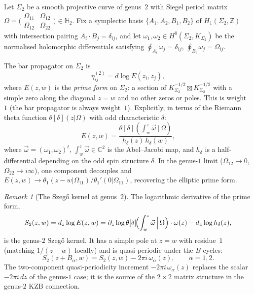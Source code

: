 \documentclass[11pt,reqno]{amsart}
\theoremstyle{definition}
\theoremstyle{remark}
\newtheorem{remark}[theorem]{Remark}
\newcommand{\CC}{\mathbb{C}}
\newcommand{\ZZ}{\mathbb{Z}}
\newcommand{\HHH}{\mathbb{H}}
\numberwithin{equation}{section}
\begin{document}
Let $\Sigma_2$ be a smooth projective curve of genus~$2$
with Siegel period matrix
$\Omega = \bigl(\begin{smallmatrix}
\Omega_{11} & \Omega_{12} \\
\Omega_{12} & \Omega_{22}
\end{smallmatrix}\bigr)
\in \HHH_2$.
Fix a symplectic basis
$\{A_1, A_2, B_1, B_2\}$ of $H_1(\Sigma_2, \ZZ)$
with intersection pairing
$A_i \cdot B_j = \delta_{ij}$, and let
$\omega_1, \omega_2 \in H^0(\Sigma_2, K_{\Sigma_2})$
be the normalised holomorphic differentials satisfying
$\oint_{A_i} \omega_j = \delta_{ij}$,
$\oint_{B_i} \omega_j = \Omega_{ij}$.

The bar propagator on $\Sigma_2$ is
\begin{equation}\label{eq:bar-prop-g2}
  \eta^{(2)}_{ij}
  = d\log E(z_i, z_j),
\end{equation}
where $E(z,w)$ is the \emph{prime form} on $\Sigma_2$:
a section of $K_{\Sigma_2}^{-1/2} \boxtimes
K_{\Sigma_2}^{-1/2}$ with a simple zero along the
diagonal $z = w$ and no other zeros or poles.
This is weight~$1$ (the bar propagator is always weight~$1$).
Explicitly, in terms of the Riemann theta function
$\theta[\delta](z|\Omega)$ with odd characteristic
$\delta$:
\begin{equation}\label{eq:prime-form-g2}
  E(z, w)
  = \frac{\theta[\delta]\!\left(
  \int_w^z \vec{\omega}\,\big|\,\Omega\right)}
  {h_\delta(z)\,h_\delta(w)},
\end{equation}
where $\vec{\omega} = (\omega_1, \omega_2)^t$,
$\int_w^z \vec{\omega} \in \CC^2$ is the Abel--Jacobi
map, and $h_\delta$ is a half-differential depending on the
odd spin structure $\delta$.
In the genus-$1$ limit
($\Omega_{12} \to 0$, $\Omega_{22} \to i\infty$), one
component decouples and
$E(z,w) \to \theta_1(z - w|\Omega_{11})/\theta_1'(0|\Omega_{11})$,
recovering the elliptic prime form.

\begin{remark}[The Szeg\H{o} kernel at genus~$2$]
\label{rem:szego-g2}
The logarithmic derivative of the prime form,
\begin{equation}\label{eq:szego-g2}
  S_2(z, w)
  = d_z \log E(z, w)
  = \partial_z \log \theta[\delta]\!\Bigl(
  \int_w^z \vec{\omega}\,\Big|\,\Omega\Bigr)
  \cdot \omega(z)
  - d_z \log h_\delta(z),
\end{equation}
is the genus-$2$ Szeg\H{o} kernel. It has a simple pole
at $z = w$ with residue~$1$ (matching $1/(z-w)$ locally)
and is quasi-periodic under the $B$-cycles:
\begin{equation}\label{eq:szego-quasiperiod}
  S_2(z + B_\alpha, w)
  = S_2(z, w)
  - 2\pi i\,\omega_\alpha(z),
  \qquad \alpha = 1, 2.
\end{equation}
The two-component quasi-periodicity
increment $-2\pi i\,\omega_\alpha(z)$ replaces the scalar
$-2\pi i\,dz$ of the genus-$1$ case; it is the source of
the $2 \times 2$ matrix structure in the genus-$2$ KZB
connection.
\end{remark}
\end{document}
